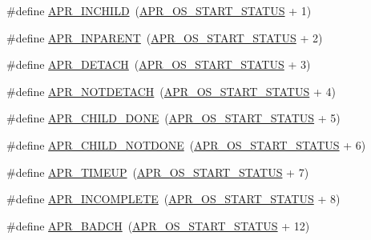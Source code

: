 \begin{DoxyCompactItemize}
\item 
\#define \hyperlink{group__APR__Error_ga5a2bb63099778699feeae9627474c179}{A\+P\+R\+\_\+\+I\+N\+C\+H\+I\+LD}~(\hyperlink{group__apr__errno_ga450e1a5734732e092ddaa5b67414f69b}{A\+P\+R\+\_\+\+O\+S\+\_\+\+S\+T\+A\+R\+T\+\_\+\+S\+T\+A\+T\+US} + 1)
\item 
\#define \hyperlink{group__APR__Error_ga79abc0fb43e51e0db87f90fa49745d89}{A\+P\+R\+\_\+\+I\+N\+P\+A\+R\+E\+NT}~(\hyperlink{group__apr__errno_ga450e1a5734732e092ddaa5b67414f69b}{A\+P\+R\+\_\+\+O\+S\+\_\+\+S\+T\+A\+R\+T\+\_\+\+S\+T\+A\+T\+US} + 2)
\item 
\#define \hyperlink{group__APR__Error_gab3f8849983a52f6558016303fb4f5cff}{A\+P\+R\+\_\+\+D\+E\+T\+A\+CH}~(\hyperlink{group__apr__errno_ga450e1a5734732e092ddaa5b67414f69b}{A\+P\+R\+\_\+\+O\+S\+\_\+\+S\+T\+A\+R\+T\+\_\+\+S\+T\+A\+T\+US} + 3)
\item 
\#define \hyperlink{group__APR__Error_ga83b8407fb5de5840f51dfd2c1439987b}{A\+P\+R\+\_\+\+N\+O\+T\+D\+E\+T\+A\+CH}~(\hyperlink{group__apr__errno_ga450e1a5734732e092ddaa5b67414f69b}{A\+P\+R\+\_\+\+O\+S\+\_\+\+S\+T\+A\+R\+T\+\_\+\+S\+T\+A\+T\+US} + 4)
\item 
\#define \hyperlink{group__APR__Error_ga2a78375cab66b8c1a4e06329e0cfcaf4}{A\+P\+R\+\_\+\+C\+H\+I\+L\+D\+\_\+\+D\+O\+NE}~(\hyperlink{group__apr__errno_ga450e1a5734732e092ddaa5b67414f69b}{A\+P\+R\+\_\+\+O\+S\+\_\+\+S\+T\+A\+R\+T\+\_\+\+S\+T\+A\+T\+US} + 5)
\item 
\#define \hyperlink{group__APR__Error_ga00bba31c29774cce3e72a31f88610340}{A\+P\+R\+\_\+\+C\+H\+I\+L\+D\+\_\+\+N\+O\+T\+D\+O\+NE}~(\hyperlink{group__apr__errno_ga450e1a5734732e092ddaa5b67414f69b}{A\+P\+R\+\_\+\+O\+S\+\_\+\+S\+T\+A\+R\+T\+\_\+\+S\+T\+A\+T\+US} + 6)
\item 
\#define \hyperlink{group__APR__Error_ga9ac087c25ffb0d3bb4d75bee36709853}{A\+P\+R\+\_\+\+T\+I\+M\+E\+UP}~(\hyperlink{group__apr__errno_ga450e1a5734732e092ddaa5b67414f69b}{A\+P\+R\+\_\+\+O\+S\+\_\+\+S\+T\+A\+R\+T\+\_\+\+S\+T\+A\+T\+US} + 7)
\item 
\#define \hyperlink{group__APR__Error_ga64dff43b83bcefd3f3c751be6b864ca1}{A\+P\+R\+\_\+\+I\+N\+C\+O\+M\+P\+L\+E\+TE}~(\hyperlink{group__apr__errno_ga450e1a5734732e092ddaa5b67414f69b}{A\+P\+R\+\_\+\+O\+S\+\_\+\+S\+T\+A\+R\+T\+\_\+\+S\+T\+A\+T\+US} + 8)
\item 
\#define \hyperlink{group__APR__Error_ga6f3ca71069880d9fe5678687a257d616}{A\+P\+R\+\_\+\+B\+A\+D\+CH}~(\hyperlink{group__apr__errno_ga450e1a5734732e092ddaa5b67414f69b}{A\+P\+R\+\_\+\+O\+S\+\_\+\+S\+T\+A\+R\+T\+\_\+\+S\+T\+A\+T\+US} + 12)

\end{DoxyCompactItemize}
